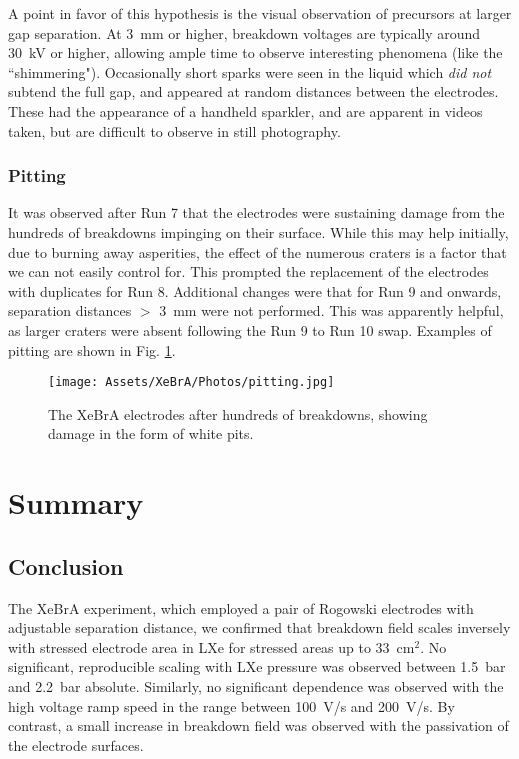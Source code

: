 A point in favor of this hypothesis is the visual observation of precursors at larger gap separation.
At 3~mm or higher, breakdown voltages are typically around 30~kV or higher, allowing ample time to observe interesting phenomena (like the ``shimmering").
Occasionally short sparks were seen in the liquid which \textit{did not} subtend the full gap, and appeared at random distances between the electrodes.
These had the appearance of a handheld sparkler, and are apparent in videos taken, but are difficult to observe in still photography.


\subsubsection{Pitting}
It was observed after Run 7 that the electrodes were sustaining damage from the hundreds of breakdowns impinging on their surface.
While this may help initially, due to burning away asperities, the effect of the numerous craters is a factor that we can not easily control for.
This prompted the replacement of the electrodes with duplicates for Run 8.
Additional changes were that for Run 9 and onwards, separation distances $>$ 3~mm were not performed.
This was apparently helpful, as larger craters were absent following the Run 9 to Run 10 swap.
Examples of pitting are shown in Fig. \ref{fig:pitting}.

\begin{figure}
    \centering
    \texttt{[image: Assets/XeBrA/Photos/pitting.jpg]}
    \caption{
    The XeBrA electrodes after hundreds of breakdowns, showing damage in the form of white pits.
    }
    \label{fig:pitting}
\end{figure}

\section{Summary}

\subsection{Conclusion}

The XeBrA experiment, which employed a pair of Rogowski electrodes with adjustable separation distance, we confirmed that breakdown field scales inversely with stressed electrode area in LXe for stressed areas up to 33~cm$^{2}$. 
No significant, reproducible scaling with LXe pressure was observed between 1.5~bar and 2.2~bar absolute.
Similarly, no significant dependence was observed with the high voltage ramp speed in the range between 100~V/s and 200~V/s.
By contrast, a small increase in breakdown field was observed with the passivation of the electrode surfaces.

